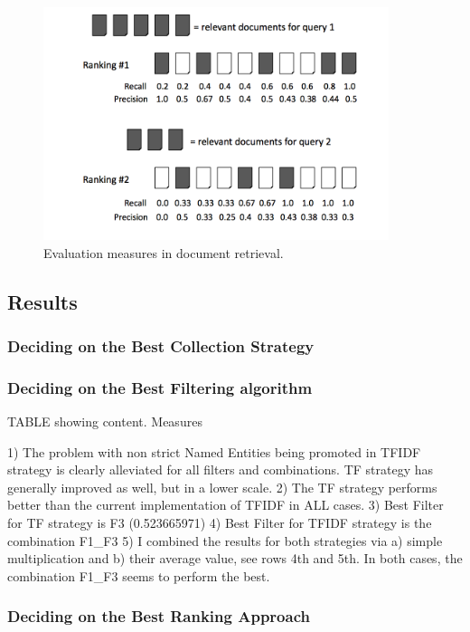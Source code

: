 \documentclass{llncs}
\begin{document}
\begin{figure}[h!]
\centering
\includegraphics[width=0.9\textwidth]{figure/cumulativeGain}
\caption{Evaluation measures in document retrieval.}
\label{fig:namedCumulativeGain}%
\end{figure}

\subsection{Results}
\subsubsection{Deciding on the Best Collection Strategy}
\subsubsection{Deciding on the Best Filtering algorithm}
\label{sec:FilteringExperiments}

TABLE showing content. Measures

1) The problem with non strict Named Entities being promoted in TFIDF strategy is clearly alleviated for all filters and combinations. TF strategy has generally improved as well, but in a lower scale.
2) The TF strategy performs better than the current implementation of TFIDF in ALL cases.
3) Best Filter for TF strategy is F3 (0.523665971)
4) Best Filter for TFIDF strategy is the combination F1\_F3
5) I combined the results for both strategies via a) simple multiplication and b) their average value, see rows 4th and 5th. In both cases, the combination F1\_F3 seems to perform the best.

\subsubsection{Deciding on the Best Ranking Approach}
\label{sec:decidingRanking}
\end{document}

